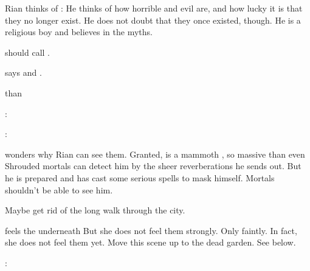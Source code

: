 \begin{changes}
    Rian thinks of \dragons:
    He thinks of how horrible and evil \dragons are, and how lucky it is that they no longer exist.
    He does not doubt that they once existed, though.
    He is a religious boy and believes in the myths.
  
  
    \begin{comment}
      \subparagraph{Criseis on the walk through the city}
    \end{comment}
    \Criseis{} should call \Ishnaruchaefir{} . 
    
    \Ishnaruchaefir{} says  and . 
    
    \Criseis{}  than 
    \begin{prose}
      \Ishnaruchaefir: 
      
      \Criseis:
    \end{prose}

    \Criseis{} wonders why Rian can see them. 
    Granted, \Ishnaruchaefir{} is a mammoth \vertex, so massive than even Shrouded mortals can detect him by the sheer reverberations he sends out. 
    But he is prepared and has cast some serious spells to mask himself. 
    Mortals shouldn't be able to see him. 
    
    \begin{prose}
    \end{prose}
    
    Maybe get rid of the long walk through the city. 
    
    \Criseis{} feels the \noggyaleth{} underneath \Malcur
    But she does not feel them strongly. 
    Only faintly.
    In fact, she does not feel them yet.
    Move this scene up to the dead garden. 
    See below. 
   
    
    \begin{prose}
      \Criseis:
    \end{prose}
      

\end{changes}
